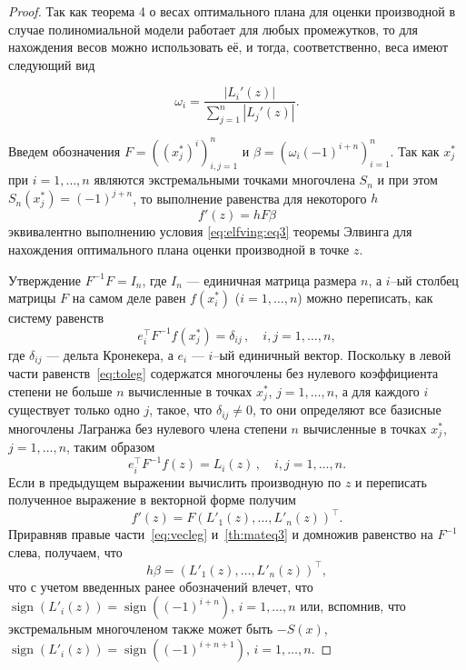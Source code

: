 \documentclass[specialist,
               substylefile = spbu.rtx,
               subf,href,colorlinks=true, 12pt]{disser}
\theoremstyle{definition}
\DeclareMathOperator*{\sign}{sign}
\newcommand\abs[1]{\left\lvert#1\right\rvert}
\begin{document}
\begin{proof}
	Так как теорема 4 о весах оптимального плана для оценки производной в случае полиномиальной модели работает для любых промежутков, то для нахождения весов можно использовать её, и тогда, соответственно, веса имеют следующий вид
	
	\begin{equation*}
		\omega_i = \frac{\abs{L_i'(z)}}{\sum_{j=1}^n \abs{L_j'(z)}}.
	\end{equation*}
	
	Введем обозначения $F = \left((x_j^*)^i\right)^n_{i, j = 1}$ и $\beta = \left( \omega_i (-1)^{i+n} \right)_{i=1}^n$. Так как $x_j^*$ при $i = 1, \ldots , n$ являются экстремальными точками многочлена $S_n$ и при этом $S_n(x_j^*) = (-1)^{j+n}$, то выполнение равенства для некоторого $h$
	\begin{equation}
		\label{th:mateq3}
		f'(z) = hF\beta
	\end{equation}
	 эквивалентно выполнению условия \eqref{eq:elfving:eq3} теоремы Элвинга для нахождения оптимального плана оценки производной в точке $z$.
	 
	Утверждение $F^{-1}F = I_n$, где $I_n$ --- единичная матрица размера $n$, а $i$--ый столбец матрицы $F$ на самом деле равен $f(x_i^*)$ ($i = 1, \ldots, n$) можно переписать, как систему равенств
	\begin{equation*}
		e_i^{\top} F^{-1} f(x_j^*) = \delta_{ij} \, , \quad i, j = 1, \ldots , n ,
	\end{equation*}
	где $\delta_{ij}$ --- дельта Кронекера, а $e_i$ --- $i$--ый единичный вектор. Поскольку в левой части равенств~\eqref{eq:toleg} содержатся многочлены без нулевого коэффициента степени не больше $n$ вычисленные в точках $x_j^*$, $j=1, \ldots , n$, а для каждого $i$ существует только одно $j$, такое, что $\delta_{ij} \neq 0$, то они определяют все базисные многочлены Лагранжа без нулевого члена степени $n$ вычисленные в точках $x_j^*$, $j=1, \ldots , n$, таким образом
	\begin{equation*}
		e_i^{\top} F^{-1} f(z) = L_i(z) \, , \quad i, j = 1, \ldots , n .
	\end{equation*}
	Если в предыдущем выражении вычислить производную по $z$ и переписать полученное выражение в векторной форме получим
	\begin{equation}
		\label{eq:vecleg}
		f'(z) = F \left( L'_1(z), \ldots, L'_n(z) \right)^\top.
	\end{equation}
	Приравняв правые части~\eqref{eq:vecleg} и~\eqref{th:mateq3} и домножив равенство на $F^{-1}$ слева, получаем, что
	\begin{equation*}
		h \beta = \left( L'_1(z), \ldots, L'_n(z) \right)^\top,
	\end{equation*}
	что с учетом введенных ранее обозначений влечет, что $\sign (L'_i(z)) = \sign((-1)^{i+n}) $, $i = 1, \ldots, n$ или, вспомнив, что экстремальным многочленом также может быть $-S(x)$,  $\sign (L'_i(z)) = \sign((-1)^{i+n+1}) $, $i = 1, \ldots, n$.
	

\end{proof}
\end{document}
